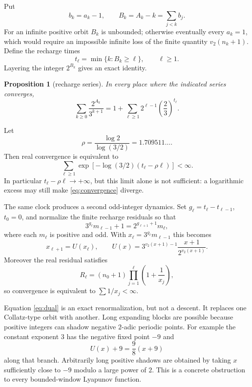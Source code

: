 \documentclass[11pt,reqno]{amsart}
\theoremstyle{plain}
\newtheorem{proposition}[theorem]{Proposition}
\theoremstyle{definition}
\numberwithin{equation}{section}
\begin{document}
Put
\[
b_k=a_k-1,\qquad B_k=A_k-k=\sum_{j<k}b_j.
\]
For an infinite positive orbit $B_k$ is unbounded; otherwise eventually every
$a_k=1$, which would require an impossible infinite loss of the finite
quantity $v_2(n_k+1)$.  Define the recharge times
\[
t_\ell=\min\{k:B_k\ge\ell\},\qquad \ell\ge1.
\]
Layering the integer $2^{B_k}$ gives an exact identity.

\begin{proposition}[recharge series]
\label{prop:recharge}
In every place where the indicated series converges,
\begin{equation}\label{eq:recharge}
\sum_{k\ge0}\frac{2^{A_k}}{3^{k+1}}
=1+\sum_{\ell\ge1}2^{\ell-1}
\left(\frac23\right)^{t_\ell}.
\end{equation}
\end{proposition}

Let
\[
\rho=\frac{\log2}{\log(3/2)}=1.709511\ldots.
\]
Then real convergence is equivalent to
\begin{equation}\label{eq:convergence}
\sum_{\ell\ge1}
\exp\!\left[-\log(3/2)(t_\ell-\rho\ell)\right]<\infty.
\end{equation}
In particular $t_\ell-\rho\ell\to+\infty$, but this limit alone is not
sufficient: a logarithmic excess may still make \eqref{eq:convergence}
diverge.

The same clock produces a second odd-integer dynamics.  Set
$g_\ell=t_\ell-t_{\ell-1}$, $t_0=0$, and normalize the finite recharge
residuals so that
\[
3^{g_\ell}m_{\ell-1}+1
=2^{g_{\ell+1}+1}m_\ell,
\]
where each $m_\ell$ is positive and odd.  With
$x_\ell=3^{g_\ell}m_{\ell-1}$ this becomes
\begin{equation}\label{eq:dual}
x_{\ell+1}=U(x_\ell),
\qquad
U(x)=
3^{v_2(x+1)-1}\frac{x+1}{2^{v_2(x+1)}}.
\end{equation}
Moreover the real residual satisfies
\[
R_\ell=(n_0+1)
\prod_{j=1}^{\ell}\left(1+\frac1{x_j}\right),
\]
so convergence is equivalent to $\sum1/x_j<\infty$.

Equation \eqref{eq:dual} is an exact renormalization, but not a descent.  It
replaces one Collatz-type orbit with another.  Long expanding blocks are
possible because positive integers can shadow negative $2$-adic periodic
points.  For example the constant exponent $3$ has the negative fixed point
$-9$ and
\[
U(x)+9=\frac98(x+9)
\]
along that branch.  Arbitrarily long positive shadows are obtained by taking
$x$ sufficiently close to $-9$ modulo a large power of $2$.  This is a
concrete obstruction to every bounded-window Lyapunov function.
\end{document}
